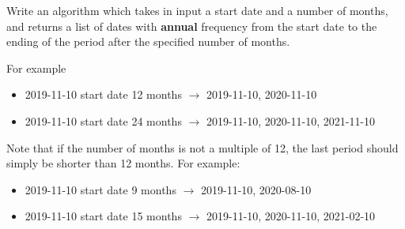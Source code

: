 \begin{question}
Write an algorithm which takes in input a start date and a number of months, and returns a list of dates with \textbf{annual} frequency from the start date to the ending of the period after the specified number of months.

For example
\begin{itemize}
\item 2019-11-10 start date 12 months \(\rightarrow\) 2019-11-10, 2020-11-10
\item 2019-11-10 start date 24 months \(\rightarrow\) 2019-11-10, 2020-11-10, 2021-11-10
\end{itemize}

Note that if the number of months is not a multiple of 12, the last period should simply be shorter than 12 months. For example:

\begin{itemize}
\item 2019-11-10 start date 9 months \(\rightarrow\) 2019-11-10, 2020-08-10
\item 2019-11-10 start date 15 months \(\rightarrow\) 2019-11-10, 2020-11-10, 2021-02-10
\end{itemize}



\end{question}
